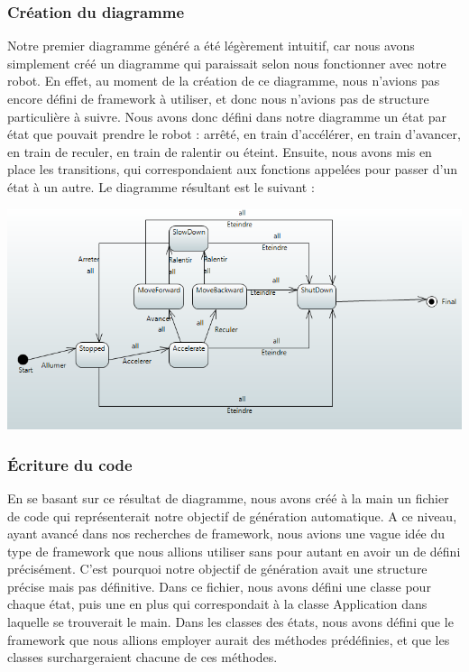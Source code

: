 \documentclass[french, 12pt, a4paper]{article}
\begin{document}
    \subsubsection{Création du diagramme}
    Notre premier diagramme généré a été légèrement intuitif, car nous avons simplement créé un diagramme qui paraissait selon nous fonctionner avec notre robot. En effet, au moment de la création de ce diagramme, nous n'avions pas encore défini de framework à utiliser, et donc nous n'avions pas de structure particulière à suivre. 
    Nous avons donc défini dans notre diagramme un état par état que pouvait prendre le robot : arrêté, en train d'accélérer, en train d'avancer, en train de reculer, en train de ralentir ou éteint. 
    Ensuite, nous avons mis en place les transitions, qui correspondaient aux fonctions appelées pour passer d'un état à un autre. 
    Le diagramme résultant est le suivant : 
    
	\begin{center}
				\captionsetup{type=figure}
				\includegraphics[scale=0.6]{Images/diagrammeV1.png}
	\end{center}
    
    \subsubsection{Écriture du code}
    En se basant sur ce résultat de diagramme, nous avons créé à la main un fichier de code qui représenterait notre objectif de génération automatique. A ce niveau, ayant avancé dans nos recherches de framework, nous avions une vague idée du type de framework que nous allions utiliser sans pour autant en avoir un de défini précisément. C'est pourquoi notre objectif de génération avait une structure précise mais pas définitive. 
    Dans ce fichier, nous avons défini une classe pour chaque état, puis une en plus qui correspondait à la classe Application dans laquelle se trouverait le main. 
    Dans les classes des états, nous avons défini que le framework que nous allions employer aurait des méthodes prédéfinies, et que les classes surchargeraient chacune de ces méthodes. 
    
\end{document}
